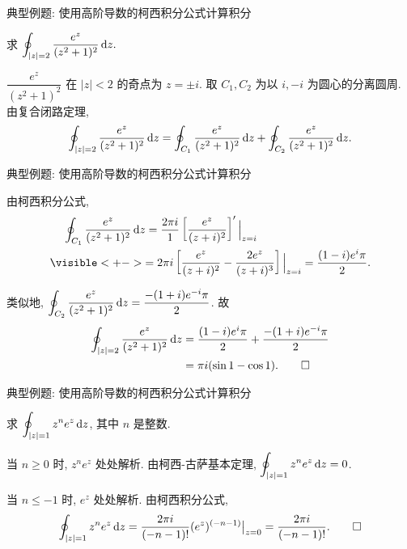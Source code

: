 \begin{frame}{典型例题: 使用高阶导数的柯西积分公式计算积分}
\begin{example}
求 $\displaystyle\oint_{|z|=2}\frac{e^z}{(z^2+1)^2}\,\mathrm{d} z.$
\end{example}
\begin{solutions}
$\dfrac{e^z}{(z^2+1)^2}$ 在 $|z|<2$ 的奇点为 $z=\pm i$.
\onslide<+->
取 $C_1,C_2$ 为以 $i,-i$ 为圆心的分离圆周.
\onslide<+->
由复合闭路定理,
\[\oint_{|z|=2}\frac{e^z}{(z^2+1)^2}\,\mathrm{d} z
=\oint_{C_1}\frac{e^z}{(z^2+1)^2}\,\mathrm{d} z
+\oint_{C_2}\frac{e^z}{(z^2+1)^2}\,\mathrm{d} z.\]
\end{solutions}
\end{frame}


\begin{frame}{典型例题: 使用高阶导数的柯西积分公式计算积分}
\begin{solutione}
由柯西积分公式,
\begin{align*}
&\peq\oint_{C_1}\frac{e^z}{(z^2+1)^2}\diff z
=\frac{2\pi i}{1}\left[\frac{e^z}{(z+i)^2}\right]'\Big|_{z=i}\\
&\visible<+->{=2\pi i\left[\frac{e^z}{(z+i)^2}-\frac{2e^z}{(z+i)^3}\right]\Big|_{z=i}
=\frac{(1-i)e^i\pi}2.}
\end{align*}
\onslide<+->

类似地, $\displaystyle\oint_{C_2}\frac{e^z}{(z^2+1)^2}\,\mathrm{d} z=\frac{-(1+i)e^{-i}\pi}2$.
\onslide<+->
故
\begin{align*}
\oint_{|z|=2}\frac{e^z}{(z^2+1)^2}\,\mathrm{d} z
&=\frac{(1-i)e^i\pi}2+\frac{-(1+i)e^{-i}\pi}2\\
&=\pi i(\sin1-\cos1).\qedhere
\end{align*}
\vspace{-18pt}
\end{solutione}
\end{frame}


\begin{frame}{典型例题: 使用高阶导数的柯西积分公式计算积分}
\begin{example}
求 $\displaystyle\oint_{|z|=1}z^ne^z\,\mathrm{d} z$, 其中 $n$ 是整数.
\end{example}
\begin{solution}
\indent
当 $n\ge 0$ 时, $z^ne^z$ 处处解析.
\onslide<+->
由柯西-古萨基本定理, $\displaystyle\oint_{|z|=1}z^ne^z\,\mathrm{d} z=0$.

\indent
\onslide<+->
当 $n\le-1$ 时, $e^z$ 处处解析.
\onslide<+->
由柯西积分公式,
\[\oint_{|z|=1}z^ne^z\,\mathrm{d} z
=\frac{2\pi i}{(-n-1)!}(e^z)^{(-n-1)}\big|_{z=0}
=\frac{2\pi i}{(-n-1)!}.\qedhere\]
\end{solution}
\end{frame}


